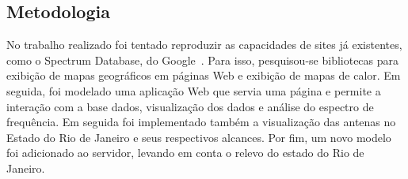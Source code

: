 \subsection{Metodologia}

No trabalho realizado foi tentado reproduzir as capacidades de sites já existentes, como o Spectrum Database, do Google~\cite{googlespectrumdatabase}. Para isso, pesquisou-se bibliotecas para exibição de mapas geográficos em páginas Web e exibição de mapas de calor. Em seguida, foi modelado uma aplicação Web que servia uma página e permite a interação com a base dados, visualização dos dados e análise do espectro de frequência. Em seguida foi implementado também a visualização das antenas no Estado do Rio de Janeiro e seus respectivos alcances. Por fim, um novo modelo foi adicionado ao servidor, levando em conta o relevo do estado do Rio de Janeiro.


